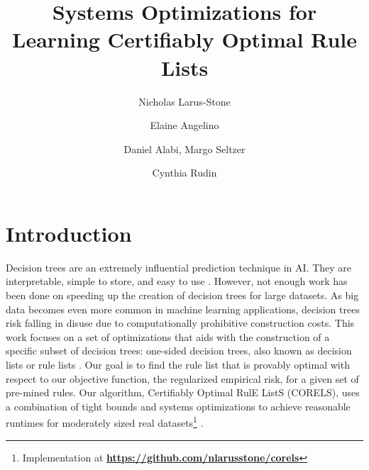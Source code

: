 \documentclass[format=sigconf]{acmart}
\begin{document}
\title{Systems Optimizations for Learning Certifiably Optimal Rule Lists}
\author{Nicholas Larus-Stone}

\author{Elaine Angelino}

\author{Daniel Alabi, Margo Seltzer}

\author{Cynthia Rudin}

\setlength{\abovedisplayskip}{3pt}
\setlength{\belowdisplayskip}{-10pt}
\setlength{\textfloatsep}{8pt}

\maketitle

\section{Introduction}
Decision trees are an extremely influential prediction technique in AI.
They are interpretable, simple to store, and easy to use \cite{BreimanFrOlSt84}.
However, not enough work has been done on speeding up the creation of decision trees for large datasets.
As big data becomes even more common in machine learning applications, decision trees risk falling in disuse due to computationally prohibitive construction costs.
This work focuses on a set of optimizations that aids with the construction of a specific subset of decision trees: one-sided decision trees, also known as decision lists or rule lists \cite{Rivest87}.
Our goal is to find the rule list that is provably optimal with respect to our objective function, the regularized empirical risk, for a given set of pre-mined rules.
Our algorithm, Certifiably Optimal RulE ListS (CORELS), uses a combination of tight bounds and systems optimizations to achieve reasonable runtimes for moderately sized real datasets\footnote{Implementation at \textbf{\url{https://github.com/nlarusstone/corels}}} \citep{AngelinoLaAlSeRu17-kdd, AngelinoLaAlSeRu17}.
\end{document}
